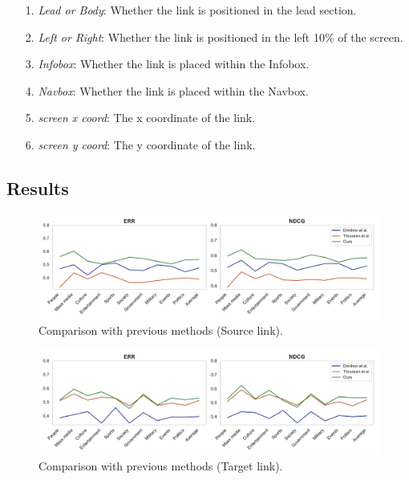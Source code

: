 \begin{itemize}
    \item[1.] \emph{Lead or Body}: Whether the link is positioned in the lead section.

    \item[2.] \emph{Left or Right}: Whether the link is positioned in the left 10\% of the screen.

    \item[3.] \emph{Infobox}: Whether the link is placed within the Infobox.

    \item[4.] \emph{Navbox}: Whether the link is placed within the Navbox.

    \item[5.] \emph{screen x coord}: The x coordinate of the link.
    
    \item[6.] \emph{screen y coord}: The y coordinate of the link.
    
\end{itemize}

\subsection{Results}

\begin{figure}[t]
\centering
\includegraphics[width=1\textwidth]{exp_tab1_src}
\caption{Comparison with previous methods (Source link).}
\label{table_cmp1}
\end{figure}

\begin{figure}[t]
\centering
\includegraphics[width=1\textwidth]{exp_tab1_tgt}
\caption{Comparison with previous methods (Target link).}
\label{table_cmp2}
\end{figure}

